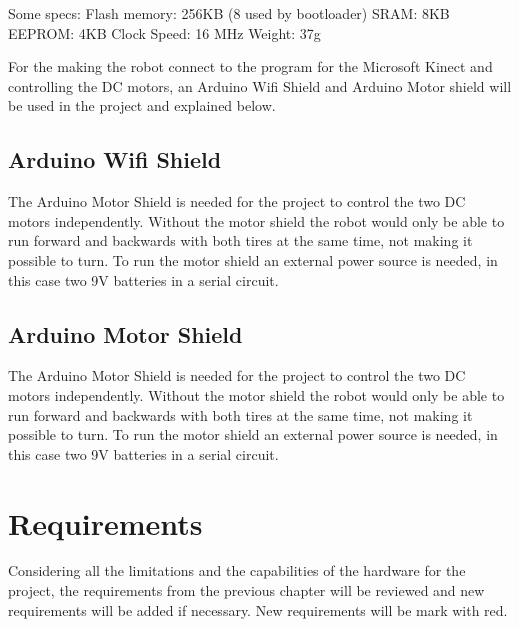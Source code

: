 Some specs:\newline
Flash memory: 256KB (8 used by bootloader)\newline
SRAM: 8KB\newline
EEPROM: 4KB\newline
Clock Speed: 16 MHz\newline
Weight: 37g

For the making the robot connect to the program for the Microsoft Kinect and controlling the DC motors, an Arduino Wifi Shield and Arduino Motor shield will be used in the project and explained below.

\subsection{Arduino Wifi Shield}
\label{sec: Arduino Wifi Shield}
The Arduino Motor Shield is needed for the project to control the two DC motors independently. Without the motor shield the robot would only be able to run forward and backwards with both tires at the same time, not making it possible to turn. 
To run the motor shield an external power source is needed, in this case two 9V batteries in a serial circuit. 

\subsection{Arduino Motor Shield}
\label{sec:Arduino Motor Shield}
The Arduino Motor Shield is needed for the project to control the two DC motors independently. Without the motor shield the robot would only be able to run forward and backwards with both tires at the same time, not making it possible to turn. 
To run the motor shield an external power source is needed, in this case two 9V batteries in a serial circuit. \citep{ams}

\section{Requirements}
\label{sec:HWrequirements}
Considering all the limitations and the capabilities of the hardware for the project, the requirements from the previous chapter will be reviewed and new requirements will be added if necessary. New requirements will be mark with red. 

